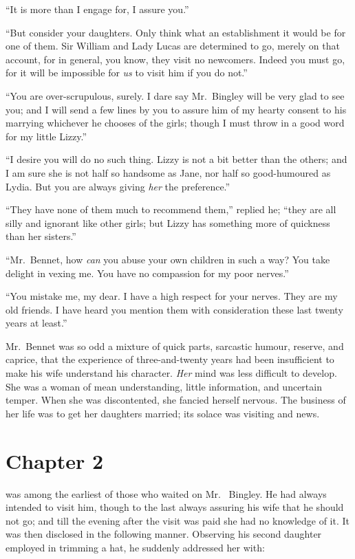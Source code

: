 ``It is more than I engage for, I assure you.''

``But consider your daughters.  Only think what an establishment
it would be for one of them.  Sir William and Lady Lucas are
determined to go, merely on that account, for in general, you
know, they visit no newcomers.  Indeed you must go, for it will
be impossible for \emph{us} to visit him if you do not.''

``You are over-scrupulous, surely.  I dare say Mr.\ Bingley will
be very glad to see you; and I will send a few lines by you to
assure him of my hearty consent to his marrying whichever he
chooses of the girls; though I must throw in a good word for
my little Lizzy.''

``I desire you will do no such thing.  Lizzy is not a bit better
than the others; and I am sure she is not half so handsome as
Jane, nor half so good-humoured as Lydia.  But you are always
giving \emph{her} the preference.''

``They have none of them much to recommend them,'' replied he;
``they are all silly and ignorant like other girls; but Lizzy
has something more of quickness than her sisters.''

``Mr.\ Bennet, how \emph{can} you abuse your own children in such a
way?  You take delight in vexing me.  You have no compassion
for my poor nerves.''

``You mistake me, my dear.  I have a high respect for your
nerves.  They are my old friends.  I have heard you mention
them with consideration these last twenty years at least.''

Mr.\ Bennet was so odd a mixture of quick parts, sarcastic humour,
reserve, and caprice, that the experience of three-and-twenty
years had been insufficient to make his wife understand his
character.  \emph{Her} mind was less difficult to develop.  She was a
woman of mean understanding, little information, and uncertain
temper.  When she was discontented, she fancied herself nervous.
The business of her life was to get her daughters married; its
solace was visiting and news.



\chapter{Chapter 2}


 was among the earliest of those who waited on Mr.\ %
Bingley.  He had always intended to visit him, though to the last
always assuring his wife that he should not go; and till the
evening after the visit was paid she had no knowledge of it.
It was then disclosed in the following manner.  Observing his
second daughter employed in trimming a hat, he suddenly
addressed her with:

